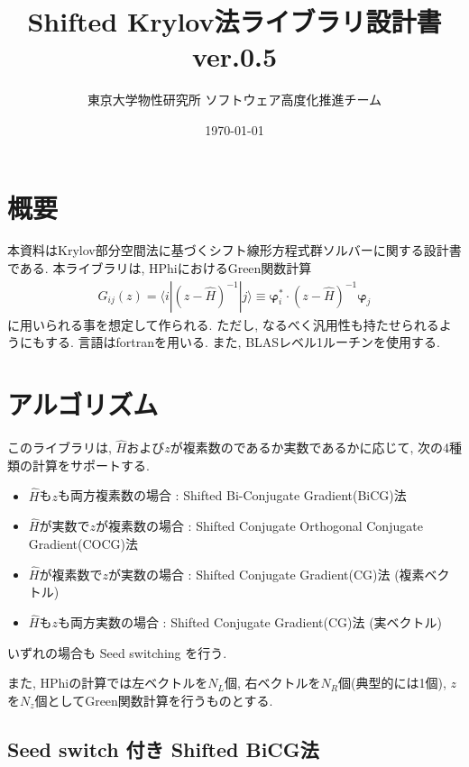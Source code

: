 \documentclass[12pt,titlepage]{jarticle}
\begin{document}
%
%
\title{Shifted Krylov法ライブラリ設計書 ver.0.5}
\author{東京大学物性研究所 ソフトウェア高度化推進チーム}
\date{\today}
\maketitle
%

%
%
\tableofcontents

\section{概要}

本資料はKrylov部分空間法に基づくシフト線形方程式群ソルバーに関する設計書である.
本ライブラリは, HPhiにおけるGreen関数計算
\begin{align}
  G_{i j}(z) = \langle i | (z-{\hat H})^{-1}| j \rangle \equiv 
  {\boldsymbol \varphi}_i^{*} \cdot (z-{\hat H})^{-1} {\boldsymbol \varphi}_j
\end{align}
に用いられる事を想定して作られる.
ただし, なるべく汎用性も持たせられるようにもする.
言語はfortranを用いる. 
また, BLASレベル1ルーチンを使用する.

\section{アルゴリズム}

このライブラリは, ${\hat H}$および$z$が複素数のであるか実数であるかに応じて,
次の4種類の計算をサポートする.

\begin{itemize}
\item ${\hat H}$も$z$も両方複素数の場合 : Shifted Bi-Conjugate Gradient(BiCG)法 \cite{BiCG}
\item ${\hat H}$が実数で$z$が複素数の場合 : Shifted Conjugate Orthogonal Conjugate Gradient(COCG)法 \cite{COCG}
\item ${\hat H}$が複素数で$z$が実数の場合 : Shifted Conjugate Gradient(CG)法 (複素ベクトル)
\item ${\hat H}$も$z$も両方実数の場合 : Shifted Conjugate Gradient(CG)法 (実ベクトル)
\end{itemize}
いずれの場合も Seed switching を行う.

また, HPhiの計算では左ベクトルを$N_L$個, 右ベクトルを$N_R$個(典型的には1個), 
$z$を$N_z$個としてGreen関数計算を行うものとする.

\subsection{Seed switch 付き Shifted BiCG法}
\end{document}
